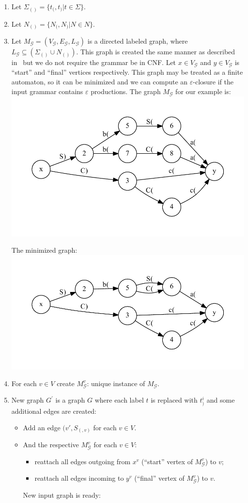 \documentclass[12pt]{article}  %
\theoremstyle{definition}
\theoremstyle{remark}
\begin{document}
\begin{enumerate}
\item Let $\Sigma_{()} =\{ t_( , t_)  | t \in \Sigma \}$.
\item Let $N_{()} = \{ N_( , N_) | N \in N  \}$.
\item Let $M_{\mathcal{G}} = (V_{\mathcal{G}}, E_{\mathcal{G}}, L_{\mathcal{G}})$ is a directed 
labeled graph, where $L_{\mathcal{G}} \subseteq (\Sigma_{()} \cup N_{()})$.
This graph is created the same manner as described in~\cite{OptimalDLR} but we do not require the grammar be in CNF.
Let $x \in V_{\mathcal{G}}$ and $y \in V_{\mathcal{G}}$ is ``start'' and ``final'' vertices respectively. 
This graph may be treated as a finite automaton, so it can be minimized and we can compute an $\varepsilon$-closure if the input grammar contains $\varepsilon$ productions.
The graph $M_{\mathcal{G}}$ for our example is:
\\
\includegraphics[width=.7\textwidth]{dot/grammar_1.pdf}


The minimized graph:
\\
\includegraphics[width=.7\textwidth]{dot/grammar_min.pdf}


\item For each $v \in V$ create $M_{\mathcal{G}}^v$: unique instance of $M_{\mathcal{G}}$.
\item New graph $G^{'}$ is a graph $G$ where each label $t$ is replaced with $t_{)}^i$ and some additional edges are created:
\begin{itemize}
\item Add an edge $(v', S_(, v)$ for each $v \in V$. 
\item And the respective $M_{\mathcal{G}}^v$ for each $v \in V$:
  \begin{itemize}
    \item reattach all edges outgoing from $x^v$ (``start'' vertex of $M_{\mathcal{G}}^v$) to $v$;
    \item reattach all edges incoming to $y^v$ (``final'' vertex of $M_{\mathcal{G}}^v$) to $v$.    
  \end{itemize}
  New input graph is ready:
  

\end{itemize}
\end{enumerate}
\end{document}
